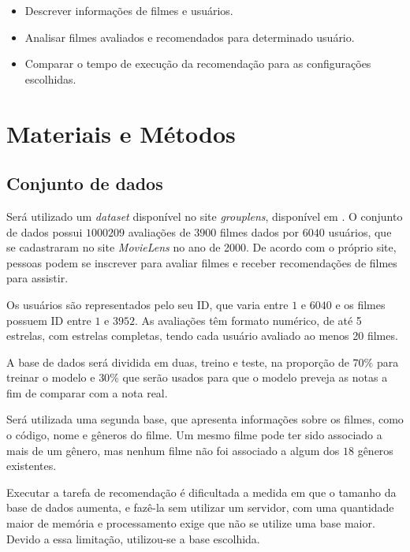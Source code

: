 \documentclass[12pt,a4paper,header]{abnt}
\begin{document}
\begin{itemize}

\item{Descrever informações de filmes e usuários.}
\item{Analisar filmes avaliados e recomendados para determinado usuário.}
\item{Comparar o tempo de execução da recomendação para as configurações escolhidas.}

\end{itemize}

\chapter{Materiais e Métodos}

\section{Conjunto de dados}

Será utilizado um \textit{dataset} disponível no site \textit{grouplens}, disponível em . O conjunto de dados possui $\num{1000209}$ avaliações de $3900$ filmes dados por $6040$ usuários\cite{harper2016movielens}, que se cadastraram no site \textit{MovieLens} no ano de 2000. De acordo com o próprio site, pessoas podem se inscrever para avaliar filmes e receber recomendações de filmes para assistir.

Os usuários são representados pelo seu ID, que varia entre $1$ e $6040$ e os filmes possuem ID entre $1$ e $3952$. As avaliações têm formato numérico, de até 5 estrelas, com estrelas completas, tendo cada usuário avaliado ao menos 20 filmes.

A base de dados será dividida em duas, treino e teste, na proporção de $70\%$ para treinar o modelo e $30\%$ que serão usados para que o modelo preveja as notas a fim de comparar com a nota real.

Será utilizada uma segunda base, que apresenta informações sobre os filmes, como o código, nome e gêneros do filme. Um mesmo filme pode ter sido associado a mais de um gênero, mas nenhum filme não foi associado a algum dos $18$ gêneros existentes.

Executar a tarefa de recomendação é dificultada a medida em que o tamanho da base de dados aumenta, e fazê-la sem utilizar um servidor, com uma quantidade maior de memória e processamento exige que não se utilize uma base maior. Devido a essa limitação, utilizou-se a base escolhida. 
\end{document}
